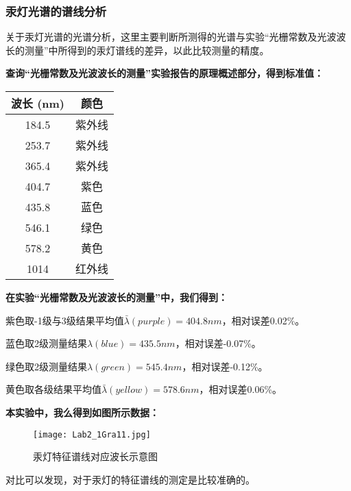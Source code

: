 \documentclass[dvipsnames, svgnames,a4paper,11pt]{article}
\begin{document}
	\subsubsection{汞灯光谱的谱线分析}
	关于汞灯光谱的光谱分析，这里主要判断所测得的光谱与实验“光栅常数及光波波长的测量”中所得到的汞灯谱线的差异，以此比较测量的精度。
	
	\textbf{查询“光栅常数及光波波长的测量”实验报告的原理概述部分，得到标准值：}
	
	\begin{center}
		\begin{tabular}{|c|c|}
			\hline
			波长 (nm) & 颜色 \\
			\hline
			184.5 & 紫外线 \\
			253.7 & 紫外线 \\
			365.4 & 紫外线 \\
			404.7 & 紫色 \\
			435.8 & 蓝色 \\
			546.1 & 绿色 \\
			578.2 & 黄色 \\
			1014 & 红外线 \\
			\hline
		\end{tabular}
	\end{center}
	
	\textbf{在实验“光栅常数及光波波长的测量”中，我们得到：}
	
	紫色取-1级与3级结果平均值$\bar{\lambda}(purple)=404.8nm$，相对误差0.02\%。
	
	蓝色取2级测量结果$\lambda(blue)=435.5nm$，相对误差-0.07\%。
	
	绿色取2级测量结果$\lambda(green)=545.4nm$，相对误差-0.12\%。
	
	黄色取各级结果平均值$\bar{\lambda}(yellow)=578.6nm$，相对误差0.06\%。
	
	\textbf{本实验中，我么得到如图所示数据：}
	
	\begin{figure}[htbp]
		\centering
		\texttt{[image: Lab2\_1Gra11.jpg]}
		\caption{汞灯特征谱线对应波长示意图}
		\label{fig:fig11}
	\end{figure}
	
	对比可以发现，对于汞灯的特征谱线的测定是比较准确的。
	
\end{document}
